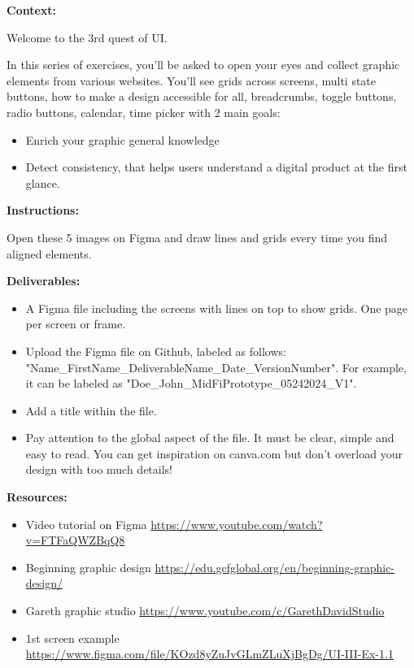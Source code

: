 \makeheaderfiles

\textbf{Context:}

Welcome to the 3rd quest of UI.

In this series of exercises, you'll be asked to open your eyes and collect graphic elements from various websites. You'll see grids across screens, multi state buttons, how to make a design accessible for all, breadcrumbs, toggle buttons, radio buttons, calendar, time picker with 2 main goals:

\begin{itemize}
\item Enrich your graphic general knowledge
\item Detect consistency, that helps users understand a digital product at the first glance.
\end{itemize}

\textbf{Instructions:}

Open these 5 images on Figma and draw lines and grids every time you find aligned elements.

\textbf{Deliverables:}

\begin{itemize}
\item A Figma file including the screens with lines on top to show grids. One page per screen or frame.
\item Upload the Figma file on Github, labeled as follows: "Name\_FirstName\_DeliverableName\_Date\_VersionNumber". For example, it can be labeled as "Doe\_John\_MidFiPrototype\_05242024\_V1".
\item Add a title within the file.
\item Pay attention to the global aspect of the file. It must be clear, simple and easy to read. You can get inspiration on canva.com but don't overload your design with too much details!
\end{itemize}

\textbf{Resources:}

\begin{itemize}
\item Video tutorial on Figma \url{https://www.youtube.com/watch?v=FTFaQWZBqQ8}
\item Beginning graphic design \url{https://edu.gcfglobal.org/en/beginning-graphic-design/}
\item Gareth graphic studio \url{https://www.youtube.com/c/GarethDavidStudio}
\item 1st screen example \url{https://www.figma.com/file/KOzd8yZuJvGLmZLuXjBgDg/UI-III-Ex-1.1} 
\end{itemize}


